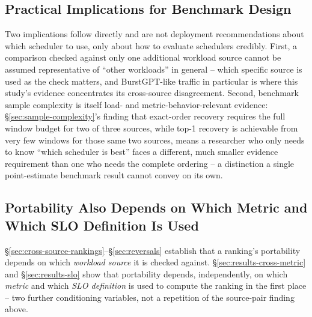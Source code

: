 \documentclass[sn-basic,Numbered,pdflatex]{sn-jnl}
\begin{document}
\subsection{Practical Implications for Benchmark Design}

Two implications follow directly and are not deployment recommendations
about which scheduler to use, only about how to evaluate schedulers
credibly. First, a comparison checked against only one additional workload
source cannot be assumed representative of ``other workloads'' in
general -- which specific source is used as the check matters, and
BurstGPT-like traffic in particular is where this study's evidence
concentrates its cross-source disagreement. Second, benchmark sample
complexity is itself load- and metric-behavior-relevant evidence:
\S\ref{sec:sample-complexity}'s finding that exact-order recovery requires
the full window budget for two of three sources, while top-1 recovery is
achievable from very few windows for those same two sources, means a
researcher who only needs to know ``which scheduler is best'' faces a
different, much smaller evidence requirement than one who needs the
complete ordering -- a distinction a single point-estimate benchmark
result cannot convey on its own.

\subsection{Portability Also Depends on Which Metric and Which SLO
Definition Is Used}

\S\ref{sec:cross-source-rankings}--\S\ref{sec:reversals} establish that a
ranking's portability depends on which \emph{workload source} it is checked
against. \S\ref{sec:results-cross-metric} and \S\ref{sec:results-slo} show
that portability depends, independently, on which \emph{metric} and which
\emph{SLO definition} is used to compute the ranking in the first place --
two further conditioning variables, not a repetition of the source-pair
finding above.
\end{document}
